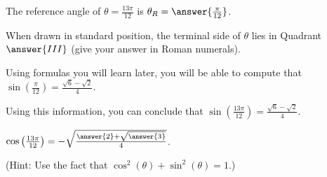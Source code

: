 \documentclass{ximera}
\author{Kenneth Berglund}
\begin{document}
\begin{exercise}
The reference angle of $\theta = \frac{13\pi}{12}$ is $\theta_R = \answer{\frac{\pi}{12}}$.

When drawn in standard position, the terminal side of $\theta$ lies in Quadrant $\answer{III}$ (give your answer in Roman numerals). 

\begin{exercise}
Using formulas you will learn later, you will be able to compute that $\sin\left(\frac{\pi}{12}\right) = \frac{\sqrt{6} - \sqrt{2}}{4}$.

Using this information, you can conclude that $\sin\left(\frac{13\pi}{12}\right) = $\wordChoice{\choice{$+$}\choice[correct]{$-$}}$\frac{\sqrt{6} - \sqrt{2}}{4}$.

\begin{exercise}
$\cos\left(\frac{13\pi}{12}\right) = -\sqrt{\frac{\answer{2} + \sqrt{\answer{3}}}{4}}$.

(Hint: Use the fact that $\cos^2(\theta) + \sin^2(\theta) = 1$.)
\end{exercise}
\end{exercise}

\end{exercise}
\end{document}
